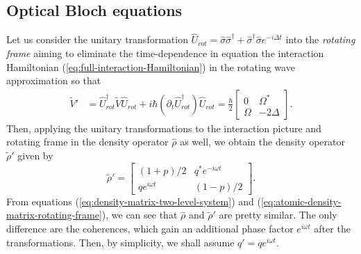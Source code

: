 \subsection{Optical Bloch equations}
\label{sec:optical-Bloch-equations}

Let us consider the unitary transformation $ \hat{U}_{rot} = \hat{\sigma}\hat{\sigma}^{\dagger} + \hat{\sigma}^{\dagger}\hat{\sigma} e^{-i \Delta t} $ into the \textit{rotating frame} aiming to eliminate the time-dependence in equation the interaction Hamiltonian (\ref{eq:full-interaction-Hamiltonian}) in the rotating wave approximation so that
\begin{align}
	\tilde{V}' &= \hat{U}^{\dagger}_{rot} \tilde{V} \hat{U}_{rot} + i \hbar (\partial_t \hat{U}^{\dagger}_{rot}) \hat{U}_{rot} = \frac{\hbar}{2}\left[\begin{matrix} 0 & \Omega^* \\ \Omega & -2\Delta \end{matrix}\right].
	\label{eq:interaction-Hamiltonian-monochromatic-light}
\end{align}
Then, applying the unitary transformations to the interaction picture and rotating frame in the density operator $ \hat{\rho} $ as well, we obtain the density operator $ \tilde{\rho}' $ given by
\begin{equation}
	\tilde{\rho}' = \left[ \begin{matrix} (1 + p)/2 & q^* e^{-i\omega t} \\ q e^{i\omega t} & (1 - p)/2 \end{matrix} \right].
	\label{eq:atomic-density-matrix-rotating-frame}
\end{equation}
From equations (\ref{eq:density-matrix-two-level-system}) and (\ref{eq:atomic-density-matrix-rotating-frame}), we can see that $ \hat{\rho} $ and $ \tilde{\rho}' $ are pretty similar. The only difference are the coherences, which gain an additional phase factor $ e^{i \omega t} $ after the transformations. Then, by simplicity, we shall assume $ q' = qe^{i \omega t} $.

